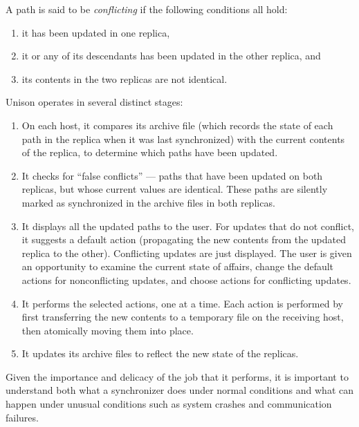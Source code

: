\documentclass{article}
\begin{document}

A path is said to be {\em conflicting} if the following conditions all hold:
\begin{enumerate}
\item it has been updated in one replica, 
\item it or any of its descendants has been updated in the other
  replica, 
and
\item its contents in the two replicas are not identical.
\end{enumerate}




Unison operates in several distinct stages:
\begin{enumerate}
\item On each host, it compares its archive file (which records
the state of each path in the replica when it was last synchronized)
with the current contents of the replica, to determine which paths
have been updated.
\item It checks for ``false conflicts'' --- paths that have been
updated on both replicas, but whose current values are identical.
These paths are silently marked as synchronized in the archive files
in both replicas.
\item It displays all the updated paths to the user.  For updates that
do not conflict, it suggests a default action (propagating the new
contents from the updated replica to the other).  Conflicting updates
are just displayed.  The user is given an opportunity to examine the
current state of affairs, change the default actions for
nonconflicting updates, and choose actions for conflicting updates.
\item It performs the selected actions, one at a time.  Each action is
performed by first transferring the new contents to a temporary file
on the receiving host, then atomically moving them into place.
\item It updates its archive files to reflect the new state of the
replicas. 
\end{enumerate}


Given the importance and delicacy of the job that it performs, it is
important to understand both what a synchronizer does under normal
conditions and what can happen under unusual conditions such as system
crashes and communication failures.  
\end{document}
